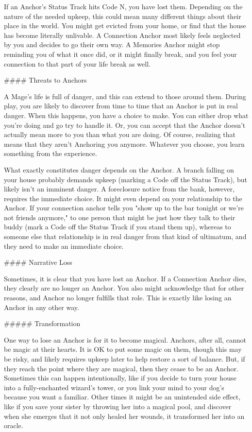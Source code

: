 \documentclass[
  oneside,
  statementpaper,
  9pt]{memoir}
\begin{document}
\begin{Player}

If an Anchor’s Status Track hits Code N, you have lost them. Depending on the nature of the needed upkeep, this could mean many different things about their place in the world. You might get evicted from your home, or find that the house has become literally unlivable. A Connection Anchor most likely feels neglected by you and decides to go their own way. A Memories Anchor might stop reminding you of what it once did, or it might finally break, and you feel your connection to that part of your life break as well.

#### Threats to Anchors

A Mage’s life is full of danger, and this can extend to those around them. During play, you are likely to discover from time to time that an Anchor is put in real danger. When this happens, you have a choice to make. You can either drop what you’re doing and go try to handle it. Or, you can accept that the Anchor doesn’t actually mean more to you than what you are doing. Of course, realizing that means that they aren’t Anchoring you anymore. Whatever you choose, you learn something from the experience.

What exactly constitutes danger depends on the Anchor. A branch falling on your house probably demands upkeep (marking a Code off the Status Track), but likely isn’t an imminent danger. A foreclosure notice from the bank, however, requires the immediate choice. It might even depend on your relationship to the Anchor. If your connection anchor tells you "show up to the bar tonight or we’re not friends anymore," to one person that might be just how they talk to their buddy (mark a Code off the Status Track if you stand them up), whereas to someone else that relationship is in real danger from that kind of ultimatum, and they need to make an immediate choice.

#### Narrative Loss

Sometimes, it is clear that you have lost an Anchor. If a Connection Anchor dies, they clearly are no longer an Anchor. You also might acknowledge that for other reasons, and Anchor no longer fulfills that role. This is exactly like losing an Anchor in any other way.

##### Transformation

One way to lose an Anchor is for it to become magical. Anchors, after all, cannot be magic at their hearts. It is OK to put some magic on them, though this may be risky, and likely requires upkeep later to help restore a sort of balance. But, if they reach the point where they are magical, then they cease to be an Anchor. Sometimes this can happen intentionally, like if you decide to turn your house into a fully-enchanted wizard’s tower, or you link your mind to your dog’s because you want a familiar. Other times it might be an unintended side effect, like if you save your sister by throwing her into a magical pool, and discover when she emerges that it not only healed her wounds, it transformed her into an oracle.


\end{Player}
\end{document}
